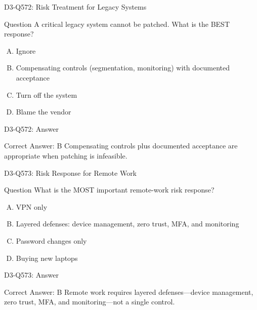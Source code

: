 \documentclass{beamer}
\begin{document}
	\begin{frame}{D3-Q572: Risk Treatment for Legacy Systems}
		\begin{block}{Question}
			A critical legacy system cannot be patched. What is the BEST response?
		\end{block}
		\begin{enumerate}[(A)]
			\item Ignore
			\item Compensating controls (segmentation, monitoring) with documented acceptance
			\item Turn off the system
			\item Blame the vendor
		\end{enumerate}
	\end{frame}
	\begin{frame}{D3-Q572: Answer}
		\begin{block}{Correct Answer: B}
			Compensating controls plus documented acceptance are appropriate when patching is infeasible.
		\end{block}
	\end{frame}
	
	\begin{frame}{D3-Q573: Risk Response for Remote Work}
		\begin{block}{Question}
			What is the MOST important remote-work risk response?
		\end{block}
		\begin{enumerate}[(A)]
			\item VPN only
			\item Layered defenses: device management, zero trust, MFA, and monitoring
			\item Password changes only
			\item Buying new laptops
		\end{enumerate}
	\end{frame}
	\begin{frame}{D3-Q573: Answer}
		\begin{block}{Correct Answer: B}
			Remote work requires layered defenses—device management, zero trust, MFA, and monitoring—not a single control.
		\end{block}
	\end{frame}
	
\end{document}
